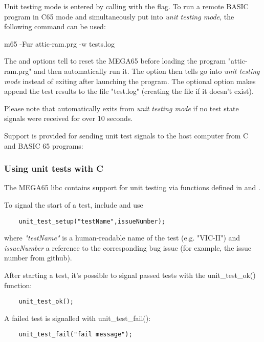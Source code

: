 Unit testing mode is entered by calling  with the  flag. 
To run a remote BASIC program in C65 mode and simultaneously put 
into \textit{unit testing mode}, the following command can be used:

\begin{screenoutput}
    m65 -Fur attic-ram.prg -w tests.log
\end{screenoutput}

The  and  options tell  to reset the MEGA65
before loading the program "attic-ram.prg" and then automatically run it. 
The  option then tells  go into \textit{unit testing mode} 
instead of exiting after launching the program.
The optional  option makes  append the test results to the 
file "test.log" (creating the file if it doesn't exist). 

Please note that  automatically exits from \textit{unit testing mode}
if no test state signals were received for over 10 seconds.

Support is provided for sending unit test signals to the host computer from
C and BASIC 65 programs:

\subsubsection{Using unit tests with C}

The MEGA65 libc contains support for unit testing via functions defined in 
 and . 

To signal the start of a test, include  and use

\begin{verbatim}
    unit_test_setup("testName",issueNumber);
\end{verbatim}

where \textit{"testName"} is a human-readable name of the test (e.g. 
"VIC-II") and \textit{issueNumber} a reference to the corresponding
bug issue (for example, the issue number from github).

After starting a test, it's possible to signal passed tests with 
the unit\_test\_ok() function:

\begin{verbatim}
    unit_test_ok();
\end{verbatim}

A failed test is signalled with unit\_test\_fail():

\begin{verbatim}
    unit_test_fail("fail message");
\end{verbatim}

